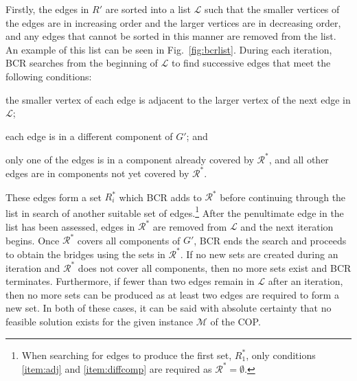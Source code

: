 \documentclass[authoryear]{elsarticle}
\begin{document}
Firstly, the edges in $R'$ are sorted into a list $\mathcal{L}$ such that the smaller vertices of the edges are in increasing order and the larger vertices are in decreasing order, and any edges that cannot be sorted in this manner are removed from the list. An example of this list can be seen in Fig.~\ref{fig:bcrlist}. During each iteration, BCR searches from the beginning of $\mathcal{L}$ to find successive edges that meet the following conditions:
\begin{enumerate*}[label={(\roman*)}]
	\item the smaller vertex of each edge is adjacent to the larger vertex of the next edge in $\mathcal{L}$;\label{item:adj}
	\item each edge is in a different component of $G'$; \label{item:diffcomp} and
	\item only one of the edges is in a component already covered by $\mathcal{R}^*$, and all other edges are in components not yet covered by $\mathcal{R}^*$.\label{item:overlap}
\end{enumerate*} 
These edges form a set $R^*_i$ which BCR adds to $\mathcal{R}^*$ before continuing through the list in search of another suitable set of edges.\footnote{When searching for edges to produce the first set, $R^*_1$, only conditions \ref{item:adj} and \ref{item:diffcomp} are required as $\mathcal{R}^* = \emptyset$.} After the penultimate edge in the list has been assessed, edges in $\mathcal{R}^*$ are removed from $\mathcal{L}$ and the next iteration begins. Once $\mathcal{R}^*$ covers all components of $G'$, BCR ends the search and proceeds to obtain the bridges using the sets in $\mathcal{R}^*$. If no new sets are created during an iteration and $\mathcal{R}^*$ does not cover all components, then no more sets exist and BCR terminates. Furthermore, if fewer than two edges remain in $\mathcal{L}$ after an iteration, then no more sets can be produced as at least two edges are required to form a new set. In both of these cases, it can be said with absolute certainty that no feasible solution exists for the given instance $\mathcal{M}$ of the COP.
\end{document}
